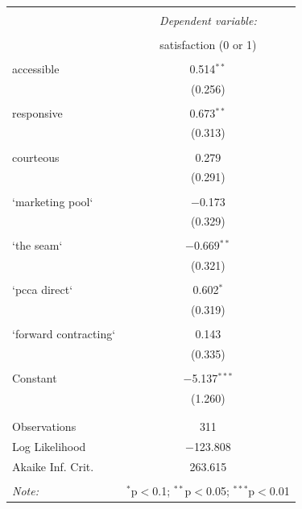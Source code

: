 \documentclass[a4paper]{article}
\begin{document}
\begin{singlespace}
	\begin{table}[H] \centering 
		\caption{} 
		\label{} 
	  \begin{tabular}{@{\extracolsep{5pt}}lc} 
	  \\[-1.8ex]\hline 
	  \hline \\[-1.8ex] 
	   & \multicolumn{1}{c}{\textit{Dependent variable:}} \\ 
	  \cline{2-2} 
	  \\[-1.8ex] & satisfaction (0 or 1) \\ 
	  \hline \\[-1.8ex] 
	   accessible & 0.514$^{**}$ \\ 
		& (0.256) \\ 
		& \\ 
	   responsive & 0.673$^{**}$ \\ 
		& (0.313) \\ 
		& \\ 
	   courteous & 0.279 \\ 
		& (0.291) \\ 
		& \\ 
	   `marketing pool` & $-$0.173 \\ 
		& (0.329) \\ 
		& \\ 
	   `the seam` & $-$0.669$^{**}$ \\ 
		& (0.321) \\ 
		& \\ 
	   `pcca direct` & 0.602$^{*}$ \\ 
		& (0.319) \\ 
		& \\ 
	   `forward contracting` & 0.143 \\ 
		& (0.335) \\ 
		& \\ 
	   Constant & $-$5.137$^{***}$ \\ 
		& (1.260) \\ 
		& \\ 
	  \hline \\[-1.8ex] 
	  Observations & 311 \\ 
	  Log Likelihood & $-$123.808 \\ 
	  Akaike Inf. Crit. & 263.615 \\ 
	  \hline 
	  \hline \\[-1.8ex] 
	  \textit{Note:}  & \multicolumn{1}{r}{$^{*}$p$<$0.1; $^{**}$p$<$0.05; $^{***}$p$<$0.01} \\ 
	  \end{tabular} 
	\end{table} 	
\end{singlespace}
\end{document}
